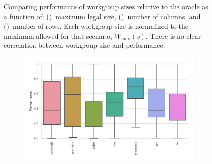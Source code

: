 \documentclass[nonatbib,preprint,nocopyrightspace,9pt]{sigplanconf}
\begin{document}
\begin{figure}
\begin{subfigure}[h]{.48\columnwidth}
    \vspace{-1.5em} %
    \caption{}
    \label{fig:performance-wg-r}
  \end{subfigure}
  \caption{%
    Comparing performance of workgroup sizes relative to the oracle as a
    function of: ()~maximum legal size,
    ()~number of columns, and ()~number of rows. Each workgroup size is normalized to the
    maximum allowed for that scenario, $W_{\max}(s)$. There is no clear
    correlation between workgroup size and performance.%
    \vspace{-1em}
  }
  \label{fig:performance-wgsizes}
\end{figure}

\begin{figure}
  \begin{subfigure}[h]{\columnwidth}
    \centering
    \includegraphics[width=\columnwidth]{img/performance_kernels.pdf}
    \vspace{-1.5em} %
    \caption{}
    \label{fig:performance-kernels}
  \end{subfigure}
  \\
  \begin{subfigure}[h]{.48\columnwidth}
    \centering

\end{subfigure}
\end{figure}
\end{document}
